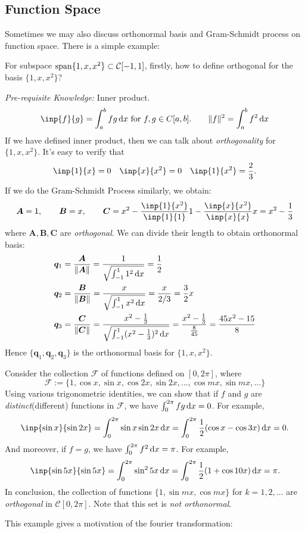 \subsection{Function Space}
Sometimes we may also discuss orthonormal basis and Gram-Schmidt process on function space. There is a simple example:
\begin{example}
For subspace $\operatorname{span}\{1,x,x^2\}\subset \mathcal{C}[-1,1]$, firstly, how to define orthogonal for the basis $\{1,x,x^2\}$?

\textit{Pre-requisite Knowledge: }Inner product.
\[
\inp{f}{g}=\int_{a}^{b}fg\diff x \text{ for $f,g\in C[a,b]$.}\qquad
\|f\|^2=\int_{a}^{b}f^2\diff x
\]
If we have defined inner product, then we can talk about \textit{orthogonality} for $\{1,x,x^2\}$. It's easy to verify that
\[
\inp{1}{x}=0\quad\inp{x}{x^2}=0\quad\inp{1}{x^2}=\frac{2}{3}.
\]
If we do the Gram-Schmidt Process similarly, we obtain:
\[
\bm A=1,\qquad\bm B=x,\qquad
\bm C=x^2-\frac{\inp{1}{x^2}}{\inp{1}{1}}1-\frac{\inp{x}{x^2}}{\inp{x}{x}}x=x^2-\frac{1}{3}
\]
where $\bm A,\bm B,\bm C$ are \textit{orthogonal}. We can divide their length to obtain orthonormal basis:
\[
\begin{aligned}
\bm q_1&=\frac{\bm A}{\|\bm A\|}=\frac{1}{\sqrt{\int_{-1}^{1}1^2\,\mathrm{d} x}}=\frac{1}{2}\qquad\\
\bm q_2&=\frac{\bm B}{\|\bm B\|}=\frac{x}{\sqrt{\int_{-1}^{1}x^2 \,\mathrm{d} x}}=\frac{x}{2/3}=\frac{3}{2}x\qquad\\
\bm q_3&=\frac{\bm C}{\|\bm C\|}=\frac{x^2-\frac{1}{3}}{\sqrt{\int_{-1}^{1}(x^2-\frac{1}{3})^2 \,\mathrm{d} x}}=\frac{x^2-\frac{1}{3}}{\frac{8}{45}}=\frac{45x^2-15}{8}
\end{aligned}
\]
Hence $\{\bm q_1,\bm q_2, \bm q_3\}$ is the orthonormal basis for $\{1,x,x^2\}$.
\end{example}
\begin{example}\label{Exp:6:11}
Consider the collection $\mathcal{F}$ of functions defined on $[0,2\pi]$, where
\[
\mathcal{F}:=\{1,\cos x,\sin x,\cos 2x,\sin 2x,\dots,\cos mx,\sin mx,\dots\}
\]
Using various trigonometric identities, we can show that if $f$ and $g$ are \emph{distinct}(different) functions in $\mathcal{F}$, we have $\int_{0}^{2\pi}fg\,\mathrm{d} x=0$. For example,
\[
\inp{\sin x}{\sin 2x}=\int_{0}^{2\pi}\sin x\sin 2x\diff x=\int_{0}^{2\pi}\frac{1}{2}(\cos x-\cos 3x)\diff x=0.
\]
And moreover, if $f=g$, we have $\int_{0}^{2\pi}f^2\,\mathrm{d} x=\pi$. For example,
\[
\inp{\sin 5x}{\sin 5x}=\int_{0}^{2\pi}\sin^2 5x\diff x=\int_{0}^{2\pi}\frac{1}{2}(1+\cos 10x)\diff x=\pi.
\]
In conclusion, the collection of functions $\{1,\sin mx,\cos mx\}$ for $k=1,2,\dots$ are \textit{orthogonal} in $\mathcal{C}[0,2\pi]$. Note that this set is \emph{not orthonormal}.
\end{example}
This example gives a motivation of the fourier transformation:
